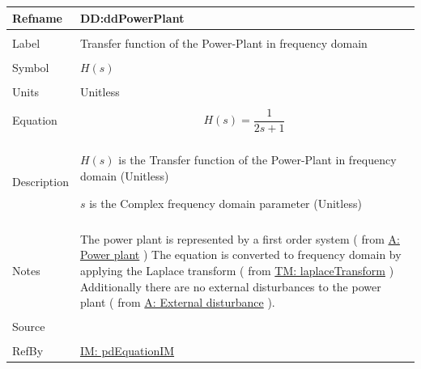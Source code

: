\documentclass[12pt]{article}
\begin{document}
\vspace{\baselineskip}
\noindent
\begin{minipage}{\textwidth}
\begin{tabular}{>{\raggedright}p{}>{\raggedright\arraybackslash}p{}}
\toprule \textbf{Refname} & \textbf{DD:ddPowerPlant}
\label{DD:ddPowerPlant}
\\ \midrule \\
Label & Transfer function of the Power-Plant in frequency domain
        
\\ \midrule \\
Symbol & $H(s)$
         
\\ \midrule \\
Units & Unitless
        
\\ \midrule \\
Equation & \begin{displaymath}
           H(s)=\frac{1}{2 s+1}
           \end{displaymath}
\\ \midrule \\
Description & \begin{symbDescription}
              \item{$H(s)$ is the Transfer function of the Power-Plant in frequency domain (Unitless)}
              \item{$s$ is the Complex frequency domain parameter (Unitless)}
              \end{symbDescription}
\\ \midrule \\
Notes & The power plant is represented by a first order system ( from  \hyperref[pwrPlant]{A: Power plant} ) The equation is converted to frequency domain by applying the Laplace transform ( from \hyperref[TM:laplaceTransform]{TM: laplaceTransform} ) Additionally there are no external disturbances to the power plant ( from  \hyperref[externalDistub]{A: External disturbance} ).
        
\\ \midrule \\
Source & \cite{pidWiki}
         
\\ \midrule \\
RefBy & \hyperref[IM:pdEquationIM]{IM: pdEquationIM}
        
\\ \bottomrule
\end{tabular}
\end{minipage}
\end{document}
